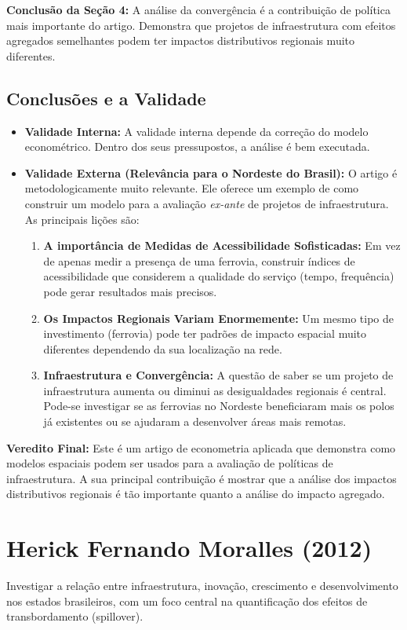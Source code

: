 \documentclass[12pt, a4paper]{article}
\begin{document}
\noindent\textbf{Conclusão da Seção 4:} A análise da convergência é a contribuição de política mais importante do artigo. Demonstra que projetos de infraestrutura com efeitos agregados semelhantes podem ter impactos distributivos regionais muito diferentes.

\subsection{Conclusões e a Validade}
\begin{itemize}
    \item \textbf{Validade Interna:} A validade interna depende da correção do modelo econométrico. Dentro dos seus pressupostos, a análise é bem executada.
    \item \textbf{Validade Externa (Relevância para o Nordeste do Brasil):} O artigo é metodologicamente muito relevante. Ele oferece um exemplo de como construir um modelo para a avaliação \textit{ex-ante} de projetos de infraestrutura. As principais lições são:
        \begin{enumerate}
            \item \textbf{A importância de Medidas de Acessibilidade Sofisticadas:} Em vez de apenas medir a presença de uma ferrovia, construir índices de acessibilidade que considerem a qualidade do serviço (tempo, frequência) pode gerar resultados mais precisos.
            \item \textbf{Os Impactos Regionais Variam Enormemente:} Um mesmo tipo de investimento (ferrovia) pode ter padrões de impacto espacial muito diferentes dependendo da sua localização na rede.
            \item \textbf{Infraestrutura e Convergência:} A questão de saber se um projeto de infraestrutura aumenta ou diminui as desigualdades regionais é central. Pode-se investigar se as ferrovias no Nordeste beneficiaram mais os polos já existentes ou se ajudaram a desenvolver áreas mais remotas.
        \end{enumerate}
\end{itemize}

\noindent\textbf{Veredito Final:} Este é um artigo de econometria aplicada que demonstra como modelos espaciais podem ser usados para a avaliação de políticas de infraestrutura. A sua principal contribuição é mostrar que a análise dos impactos distributivos regionais é tão importante quanto a análise do impacto agregado. 

\section{Herick Fernando Moralles (2012)}
Investigar a relação entre infraestrutura, inovação, crescimento e desenvolvimento nos estados brasileiros, com um foco central na quantificação dos efeitos de transbordamento (spillover).
\end{document}
